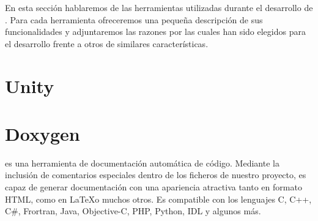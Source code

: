 







En esta sección hablaremos de las herramientas utilizadas durante el desarrollo de \nombrejuego. Para cada herramienta ofreceremos una pequeña descripción de sus funcionalidades y adjuntaremos las razones por las cuales han sido elegidos para el desarrollo frente a otros de similares características.


\section*{Unity}

\section*{Doxygen}
  es una herramienta de documentación automática de código. Mediante la inclusión de comentarios especiales dentro de los ficheros de nuestro proyecto, es capaz de generar documentación con una apariencia atractiva tanto en formato HTML, como en \LaTeX o muchos otros. Es compatible con los lenguajes C, C++, C\#, Frortran, Java, Objective-C, PHP, Python, IDL y algunos más.

